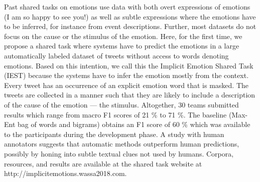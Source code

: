 Past shared tasks on emotions use data with both overt expressions of emotions (I am so happy to see you!) as well as subtle expressions where the emotions have to be inferred, for instance from event descriptions. Further, most datasets do not focus on the cause or the stimulus of the emotion. Here, for the first time, we propose a shared task where systems have to predict the emotions in a large automatically labeled dataset of tweets without access to words denoting emotions. Based on this intention, we call this the Implicit Emotion Shared Task (IEST) because the systems have to infer the emotion mostly from the context. Every tweet has an occurrence of an explicit emotion word that is masked. The tweets are collected in a manner such that they are likely to include a description of the cause of the emotion --- the stimulus. Altogether, 30 teams submitted results which range from macro F1 scores of 21 \% to 71 \%. The baseline (Max- Ent bag of words and bigrams) obtains an F1 score of 60 \% which was available to the participants during the development phase. A study with human annotators suggests that automatic methods outperform human predictions, possibly by honing into subtle textual clues not used by humans. Corpora, resources, and results are available at the shared task website at http://implicitemotions.wassa2018.com.
